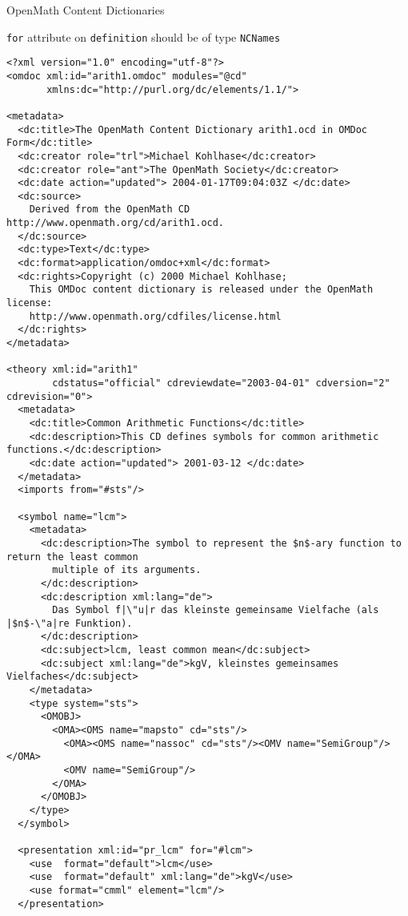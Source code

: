 \begin{tchapter}[id=omcds]{OpenMath Content Dictionaries}
\begin{erratum}[reported-by=Michael Kohlhase,date=2009-08-11]{{\texttt{for}} attribute on
    {\texttt{definition}} should be of type {\texttt{NCNames}}}
\begin{lstlisting}[label=lst:omdoccd,escapechar=\|,mathescape,
    caption={The {\openmath} content dictionary {\snippet{arith1}} in {\omdoc} form},
    index={DOCTYPE,omdoc,metadata,dc:title,dc:creator,dc:date,dc:description,dc:source,dc:type,dc:format,theory
           omtext,CMP}]
<?xml version="1.0" encoding="utf-8"?>
<omdoc xml:id="arith1.omdoc" modules="@cd"
       xmlns:dc="http://purl.org/dc/elements/1.1/">

<metadata>
  <dc:title>The OpenMath Content Dictionary arith1.ocd in OMDoc Form</dc:title>
  <dc:creator role="trl">Michael Kohlhase</dc:creator>
  <dc:creator role="ant">The OpenMath Society</dc:creator>
  <dc:date action="updated"> 2004-01-17T09:04:03Z </dc:date>
  <dc:source>
    Derived from the OpenMath CD http://www.openmath.org/cd/arith1.ocd.
  </dc:source>
  <dc:type>Text</dc:type>
  <dc:format>application/omdoc+xml</dc:format>
  <dc:rights>Copyright (c) 2000 Michael Kohlhase;
    This OMDoc content dictionary is released under the OpenMath license:
    http://www.openmath.org/cdfiles/license.html
  </dc:rights>
</metadata>

<theory xml:id="arith1"
        cdstatus="official" cdreviewdate="2003-04-01" cdversion="2" cdrevision="0">
  <metadata>
    <dc:title>Common Arithmetic Functions</dc:title>
    <dc:description>This CD defines symbols for common arithmetic functions.</dc:description>
    <dc:date action="updated"> 2001-03-12 </dc:date>
  </metadata>
  <imports from="#sts"/>

  <symbol name="lcm">
    <metadata>
      <dc:description>The symbol to represent the $n$-ary function to return the least common
        multiple of its arguments.
      </dc:description>
      <dc:description xml:lang="de"> 
        Das Symbol f|\"u|r das kleinste gemeinsame Vielfache (als |$n$-\"a|re Funktion).
      </dc:description>
      <dc:subject>lcm, least common mean</dc:subject>
      <dc:subject xml:lang="de">kgV, kleinstes gemeinsames Vielfaches</dc:subject>
    </metadata>
    <type system="sts">
      <OMOBJ>
        <OMA><OMS name="mapsto" cd="sts"/>
          <OMA><OMS name="nassoc" cd="sts"/><OMV name="SemiGroup"/></OMA>
          <OMV name="SemiGroup"/>
        </OMA>
      </OMOBJ>
    </type>
  </symbol>

  <presentation xml:id="pr_lcm" for="#lcm">
    <use  format="default">lcm</use>
    <use  format="default" xml:lang="de">kgV</use>
    <use format="cmml" element="lcm"/>
  </presentation>


\end{lstlisting}
\end{erratum}
\end{tchapter}
